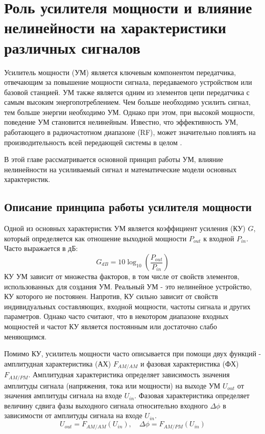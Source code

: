 \section{Роль усилителя мощности и влияние нелинейности
на характеристики различных сигналов}
Усилитель мощности (УМ) является ключевым компонентом передатчика,
отвечающим за повышение мощности сигнала, передаваемого устройством или
базовой станцией. УМ также является одним из элементов цепи передатчика с
самым высоким энергопотреблением. Чем больше необходимо усилить сигнал, тем
больше энергии необходимо УМ. Однако при этом, при высокой мощности,
поведение УМ становится нелинейным. Известно, что эффективность УМ,
работающего в радиочастотном диапазоне (RF), может значительно повлиять на
производительность всей передающей системы
в целом \cite{Lie2018}.

В этой главе рассматривается основной принцип работы УМ, влияние
нелинейности на усиливаемый сигнал и математические модели основных
характеристик.


\subsection{Описание принципа работы усилителя мощности}
Одной из основных характеристик УМ является коэффициент усиления (КУ) $G$,
который определяется как отношение выходной мощности $P_{out}$ к входной
$P_{in}$. Часто выражается в дБ:
\begin{equation}
    G_{dB} = 10\log_{10}\left(\frac{P_{out}}{P_{in}}\right)
\end{equation}
КУ УМ зависит от множества факторов, в том числе от свойств элементов,
использованных для создания УМ. Реальный УМ - это нелинейное устройство, КУ
которого не постоянен. Напротив, КУ сильно зависит от свойств
индивидуальных составляющих, входной мощности, частоты сигнала и других
параметров. Однако часто считают, что в некотором диапазоне входных
мощностей и частот КУ является постоянным или достаточно слабо
меняющимся.

Помимо КУ, усилитель мощности часто описывается при помощи двух функций -
амплитудная характеристика (АХ) $F_{AM/AM}$ и фазовая характеристика (ФХ)
$F_{AM/PM}$. Амплитудная характеристика определяет зависимость значения
амплитуды сигнала (напряжения, тока или мощности) на выходе УМ $U_{out}$ от
значения амплитуды сигнала на входе $U_{in}$. Фазовая характеристика
определяет величину сдвига фазы выходного сигнала относительно входного
$\Delta\phi$ в зависимости от амплитуды сигнала на входе $U_{in}$.
\begin{equation}
    U_{out} = F_{AM/AM}(U_{in}), \quad \Delta\phi = F_{AM/PM}(U_{in})
\end{equation}

